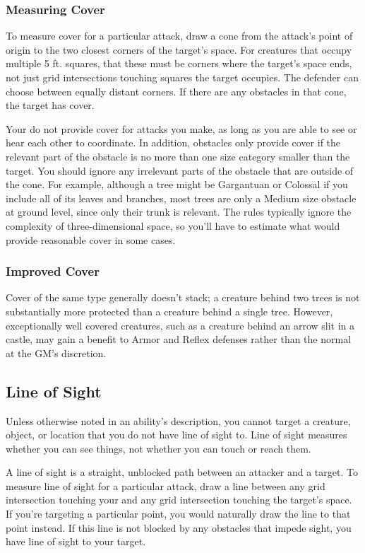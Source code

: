     \subsubsection{Measuring Cover}
      To measure cover for a particular attack, draw a cone from the attack's point of origin to the two closest corners of the target's space.
      For creatures that occupy multiple 5 ft. squares, that these must be corners where the target's space ends, not just grid intersections touching squares the target occupies.
      The defender can choose between equally distant corners.
      If there are any obstacles in that cone, the target has cover.

      Your  do not provide cover for attacks you make, as long as you are able to see or hear each other to coordinate.
      In addition, obstacles only provide cover if the relevant part of the obstacle is no more than one size category smaller than the target.
      You should ignore any irrelevant parts of the obstacle that are outside of the cone.
      For example, although a tree might be Gargantuan or Colossal if you include all of its leaves and branches, most trees are only a Medium size obstacle at ground level, since only their trunk is relevant.
      The rules typically ignore the complexity of three-dimensional space, so you'll have to estimate what would provide reasonable cover in some cases.

    \subsubsection{Improved Cover}
      Cover of the same type generally doesn't stack; a creature behind two trees is not substantially more protected than a creature behind a single tree.
      However, exceptionally well covered creatures, such as a creature behind an arrow slit in a castle, may gain a  benefit to Armor and Reflex defenses rather than the normal  at the GM's discretion.

  \subsection{Line of Sight}\label{Line of Sight}
    Unless otherwise noted in an ability's description, you cannot target a creature, object, or location that you do not have line of sight to.
    Line of sight measures whether you can see things, not whether you can touch or reach them.

    A line of sight is a straight, unblocked path between an attacker and a target.
    To measure line of sight for a particular attack, draw a line between any grid intersection touching your  and any grid intersection touching the target's space.
    If you're targeting a particular point, you would naturally draw the line to that point instead.
    If this line is not blocked by any obstacles that impede sight, you have line of sight to your target.

